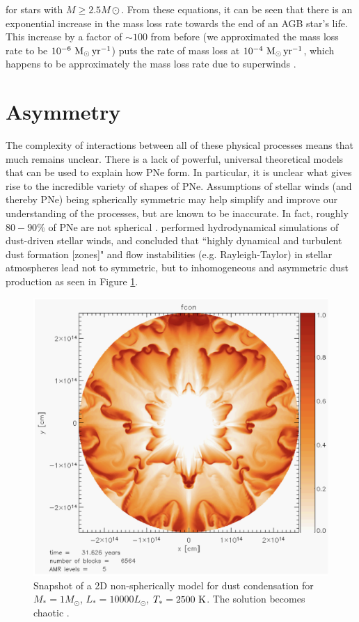 \documentclass[twocolumn]{aastex63}
\begin{document}
for stars with $M\geq 2.5M\odot$. From these equations, it can be seen that there is an exponential increase in the mass loss rate towards the end of an AGB star's life. This increase by a factor of $\sim 100$ from before (we approximated the mass loss rate to be $10^{-6}~{\rm M_\odot\,yr^{-1}}$) puts the rate of mass loss at  $10^{-4}~{\rm M_\odot\,yr^{-1}}$, which happens to be approximately the mass loss rate due to superwinds \citep{iben}. 

\section{Asymmetry}\label{sec:asymmetry}

The complexity of interactions between all of these physical processes means that much remains unclear. There is a lack of powerful, universal theoretical models that can be used to explain how PNe form. In particular, it is unclear what gives rise to the incredible variety of shapes of PNe. Assumptions of stellar winds (and thereby PNe) being spherically symmetric may help simplify and improve our understanding of the processes, but are known to be inaccurate. In fact, roughly $80-90\%$ of PNe are not spherical \citep{demarco, soker1997}. \cite{woitke} performed hydrodynamical simulations of dust-driven stellar winds, and concluded that ``highly dynamical and turbulent dust formation [zones]" and flow instabilities (e.g. Rayleigh-Taylor) in stellar atmospheres lead not to symmetric, but to inhomogeneous and asymmetric dust production as seen in Figure \ref{fig:dust_condensation}.

\begin{figure}[ht]
    \includegraphics[width=\textwidth]{dust_condensation.png}
    \caption{Snapshot of a 2D non-spherically model for dust condensation for $M_* = 1M_\odot$, $L_* = 10000L_\odot$, $T_* = 2500~{\rm K}$. The solution becomes chaotic \citep{woitke}.}
    \label{fig:dust_condensation}
\end{figure}
\end{document}
